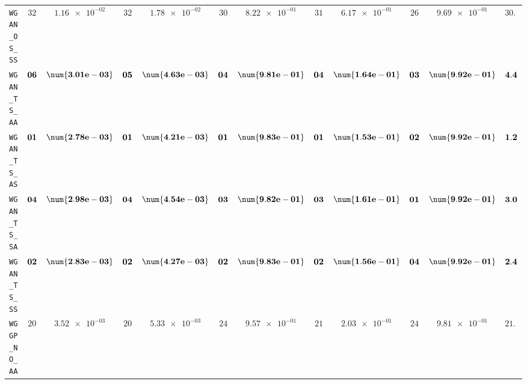 \begin{xltabular}{\textwidth}{l||cC|cC|cC|cC|cC||c}
	\texttt{WGAN\_OS\_SS} & $ 32$ & $ \num{1.16e-02}$ & $ 32$ & $ \num{1.78e-02}$ & $ 30$ & $ \num{8.22e-01}$ & $ 31$ & $ \num{6.17e-01}$ & $ 26$ & $ \num{9.69e-01}$ & $ 30.2$  \\
	\texttt{WGAN\_TS\_AA} & $\bf 06$ & $\bf \num{3.01e-03}$ & $\bf 05$ & $\bf \num{4.63e-03}$ & $\bf 04$ & $\bf \num{9.81e-01}$ & $\bf 04$ & $\bf \num{1.64e-01}$ & $\bf 03$ & $\bf \num{9.92e-01}$ & $\bf 4.4$  \\
	\texttt{WGAN\_TS\_AS} & $\bf 01$ & $\bf \num{2.78e-03}$ & $\bf 01$ & $\bf \num{4.21e-03}$ & $\bf 01$ & $\bf \num{9.83e-01}$ & $\bf 01$ & $\bf \num{1.53e-01}$ & $\bf 02$ & $\bf \num{9.92e-01}$ & $\bf 1.2$  \\
	\texttt{WGAN\_TS\_SA} & $\bf 04$ & $\bf \num{2.98e-03}$ & $\bf 04$ & $\bf \num{4.54e-03}$ & $\bf 03$ & $\bf \num{9.82e-01}$ & $\bf 03$ & $\bf \num{1.61e-01}$ & $\bf 01$ & $\bf \num{9.92e-01}$ & $\bf 3.0$  \\
	\texttt{WGAN\_TS\_SS} & $\bf 02$ & $\bf \num{2.83e-03}$ & $\bf 02$ & $\bf \num{4.27e-03}$ & $\bf 02$ & $\bf \num{9.83e-01}$ & $\bf 02$ & $\bf \num{1.56e-01}$ & $\bf 04$ & $\bf \num{9.92e-01}$ & $\bf 2.4$  \\ \hline
	\texttt{WGGP\_NO\_AA} & $ 20$ & $ \num{3.52e-03}$ & $ 20$ & $ \num{5.33e-03}$ & $ 24$ & $ \num{9.57e-01}$ & $ 21$ & $ \num{2.03e-01}$ & $ 24$ & $ \num{9.81e-01}$ & $ 21.8$  \\

\end{xltabular}

